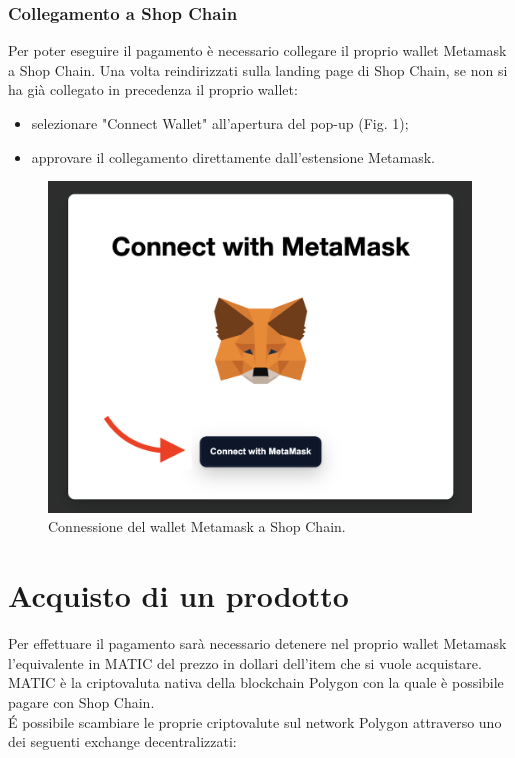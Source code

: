\documentclass[a4paper, 12pt]{article}
\begin{document}
\subsubsection{Collegamento a Shop Chain}
Per poter eseguire il pagamento è necessario collegare il proprio wallet Metamask a Shop Chain. Una volta reindirizzati sulla landing page di Shop Chain, se non si ha già collegato in precedenza il proprio wallet:
\begin {itemize}
\item selezionare "Connect Wallet" all'apertura del pop-up (Fig. 1);
\item approvare il collegamento direttamente dall'estensione Metamask.
\end{itemize}

\FloatBarrier
\begin{figure}[!h]
\centering
\includegraphics[width=0.5\linewidth]{img/connessione_wallet.png}
\caption{Connessione del wallet Metamask a Shop Chain.}
\end{figure}
\FloatBarrier

\section{Acquisto di un prodotto}
Per effettuare il pagamento sarà necessario detenere nel proprio wallet Metamask l'equivalente in MATIC del prezzo in dollari dell'item che si vuole acquistare. MATIC è la criptovaluta nativa della blockchain Polygon con la quale è possibile pagare con Shop Chain.
\\É possibile scambiare le proprie criptovalute sul network Polygon attraverso uno dei seguenti exchange decentralizzati:
\end{document}
